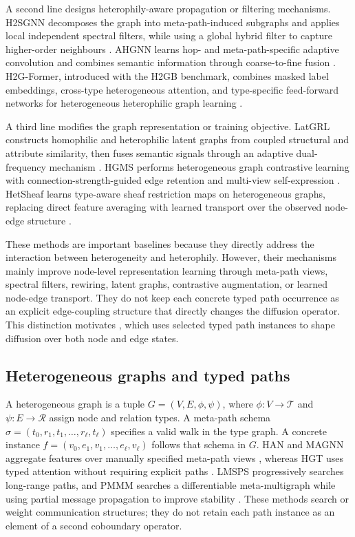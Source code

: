 A second line designs heterophily-aware propagation or filtering mechanisms. 
H2SGNN decomposes the graph into meta-path-induced subgraphs and applies local independent spectral filters, while using a global hybrid filter to capture higher-order neighbours \cite{lu2024h2sgnn}. 
AHGNN learns hop- and meta-path-specific adaptive convolution and combines semantic information through coarse-to-fine fusion \cite{chen2025ahgnn}. 
H2G-Former, introduced with the H2GB benchmark, combines masked label embeddings, cross-type heterogeneous attention, and type-specific feed-forward networks for heterogeneous heterophilic graph learning \cite{lin2024h2gb}.

A third line modifies the graph representation or training objective. 
LatGRL constructs homophilic and heterophilic latent graphs from coupled structural and attribute similarity, then fuses semantic signals through an adaptive dual-frequency mechanism \cite{shen2024latgrl}. 
HGMS performs heterogeneous graph contrastive learning with connection-strength-guided edge retention and multi-view self-expression \cite{wang2025hgms}. 
HetSheaf learns type-aware sheaf restriction maps on heterogeneous graphs, replacing direct feature averaging with learned transport over the observed node-edge structure \cite{braithwaite2024hetsheaf}.

These methods are important baselines because they directly address the interaction between heterogeneity and heterophily. 
However, their mechanisms mainly improve node-level representation learning through meta-path views, spectral filters, rewiring, latent graphs, contrastive augmentation, or learned node-edge transport. 
They do not keep each concrete typed path occurrence as an explicit edge-coupling structure that directly changes the diffusion operator. 
This distinction motivates \method{}, which uses selected typed path instances to shape diffusion over both node and edge states.

\subsection{Heterogeneous graphs and typed paths}

A heterogeneous graph is a tuple $G=(V,E,\phi,\psi)$, where $\phi:V\rightarrow\mathcal{T}$ and
$\psi:E\rightarrow\mathcal{R}$ assign node and relation types. A meta-path schema
$\sigma=(t_0,r_1,t_1,\ldots,r_\ell,t_\ell)$ specifies a valid walk in the type graph. A concrete
instance $f=(v_0,e_1,v_1,\ldots,e_\ell,v_\ell)$ follows that schema in $G$. HAN and MAGNN aggregate
features over manually specified meta-path views \cite{wang2019han,fu2020magnn}, whereas HGT uses
typed attention without requiring explicit paths \cite{hu2020hgt}. LMSPS progressively searches
long-range paths, and PMMM searches a differentiable meta-multigraph while using partial message
propagation to improve stability \cite{yan2024lmsps,jiang2022pmmm}. These methods search or weight
communication structures; they do not retain each path instance as an element of a second
coboundary operator.

